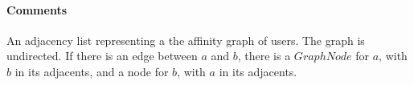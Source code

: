 \documentclass[a4paper,10pt]{article}
\begin{document}
\begin{inparaitem}[ ]
 \item \secure
 \item \persistent
 \item \unique
\end{inparaitem}

\paragraph*{Comments}
An adjacency list representing a the affinity graph of users. The graph is undirected. If there is an edge between $a$ and $b$, there is a $GraphNode$ for $a$, with $b$ in its adjacents, and a node for $b$, with $a$ in its adjacents.


\end{document}

